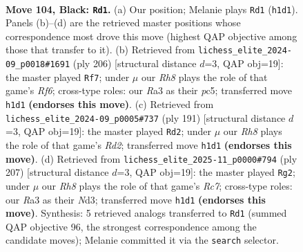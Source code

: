 \documentclass[11pt]{article}
\begin{document}
\clearpage

\begin{figure}[p]\centering
\begin{subfigure}{0.46\textwidth}\centering
\resizebox{\linewidth}{!}{%
\newchessgame
\chessboard[
  setfen={5R2/8/4k3/8/8/r7/6K1/7r b - - 19 104},
  showmover=false,
  pgfstyle=straightmove, color=movearrow, markmove={h1-d1}
]}
\caption{}
\end{subfigure}\hfill
\begin{subfigure}{0.46\textwidth}\centering
\resizebox{\linewidth}{!}{%
\newchessgame
\chessboard[
  setfen={8/8/5R2/2p1k3/8/7r/2K5/8 w - - 4 104},
  showmover=false,
  pgfstyle=straightmove, color=movearrow, markmove={f6-f7}
]}
\caption{}
\end{subfigure}
\\[4pt]
\begin{subfigure}{0.46\textwidth}\centering
\resizebox{\linewidth}{!}{%
\newchessgame
\chessboard[
  setfen={7k/3r4/4K3/8/8/8/8/6R1 b - - 21 96},
  showmover=false,
  pgfstyle=straightmove, color=movearrow, markmove={d7-d2}
]}
\caption{}
\end{subfigure}\hfill
\begin{subfigure}{0.46\textwidth}\centering
\resizebox{\linewidth}{!}{%
\newchessgame
\chessboard[
  setfen={8/4R3/8/8/8/3n1k2/2r5/1K6 b - - 39 104},
  showmover=false,
  pgfstyle=straightmove, color=movearrow, markmove={c2-g2}
]}
\caption{}
\end{subfigure}
\caption{\textbf{Move 104, Black: \texttt{Rd1}.} (a) Our position; Melanie plays \texttt{Rd1} (\texttt{h1d1}). Panels (b)--(d) are the retrieved master positions whose correspondence most drove this move (highest QAP objective among those that transfer to it). (b) Retrieved from \texttt{lichess\_elite\_2024-09\_p0018\#1691} (ply 206) [structural distance $d$=3, QAP obj=19]: the master played \texttt{Rf7}; under $\mu$ our \emph{Rh8} plays the role of that game's \emph{Rf6}; cross-type roles: our \emph{R}a3 as their \emph{p}c5; transferred move \texttt{h1d1} \textbf{(endorses this move)}. (c) Retrieved from \texttt{lichess\_elite\_2024-09\_p0005\#737} (ply 191) [structural distance $d$=3, QAP obj=19]: the master played \texttt{Rd2}; under $\mu$ our \emph{Rh8} plays the role of that game's \emph{Rd2}; transferred move \texttt{h1d1} \textbf{(endorses this move)}. (d) Retrieved from \texttt{lichess\_elite\_2025-11\_p0000\#794} (ply 207) [structural distance $d$=3, QAP obj=19]: the master played \texttt{Rg2}; under $\mu$ our \emph{Rh8} plays the role of that game's \emph{Rc7}; cross-type roles: our \emph{R}a3 as their \emph{N}d3; transferred move \texttt{h1d1} \textbf{(endorses this move)}. Synthesis: 5 retrieved analogs transferred to \texttt{Rd1} (summed QAP objective 96, the strongest correspondence among the candidate moves); Melanie committed it via the \texttt{search} selector.}
\label{fig:thought-m207}
\end{figure}
\end{document}
